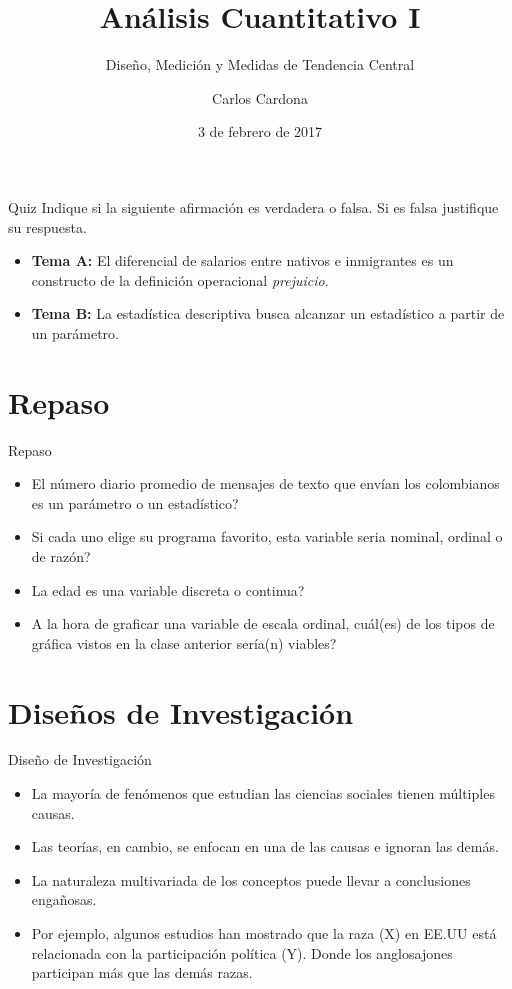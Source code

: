 \documentclass[xcolor=dvipsnames]{beamer}
\author[Carlos Cardona]{Carlos Cardona}
\title{Análisis Cuantitativo I}
\subtitle{Diseño, Medición y Medidas de Tendencia Central}
\institute[URosario]{Universidad del Rosario}
\date{3 de febrero de 2017}
\begin{document}
\maketitle

\begin{frame}{Quiz}
	\justifying
	Indique si la siguiente afirmación es verdadera o falsa. Si es falsa justifique su respuesta.
	\begin{itemize}
		\justifying
		\item {\bf Tema A:} El diferencial de salarios entre nativos e inmigrantes es un constructo de la definición operacional \emph{prejuicio}.
		\item {\bf Tema B:} La estadística descriptiva busca alcanzar un estadístico a partir de un parámetro.
	\end{itemize}
\end{frame}

\section{Repaso}
\begin{frame}{Repaso}
\begin{itemize}
\item El número diario promedio de mensajes de texto que envían los colombianos es un parámetro o un estadístico?
\item Si cada uno elige su programa favorito, esta variable seria nominal, ordinal o de razón?
\item La edad es una variable discreta o continua?
\item A la hora de graficar una variable de escala ordinal, cuál(es) de los tipos de gráfica vistos en la clase anterior sería(n) viables?
\end{itemize}
\end{frame}

\section{Diseños de Investigación}

\begin{frame}{Diseño de Investigación}
\begin{itemize}
\justifying
\item La mayoría de fenómenos que estudian las ciencias sociales tienen múltiples causas.
\item  Las teorías, en cambio, se enfocan en una de las causas e ignoran las demás.
\item La naturaleza multivariada de los conceptos puede llevar a conclusiones engañosas.
\item Por ejemplo, algunos estudios han mostrado que la raza (X) en EE.UU está relacionada con la participación política (Y). Donde los anglosajones participan más que las demás razas.
\end{itemize}
\end{frame}
\end{document}
